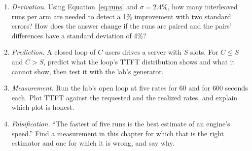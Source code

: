 \begin{enumerate}
\item \emph{Derivation.} Using Equation~\ref{eq:runs} and $\sigma = 2.4\%$, how
  many interleaved runs per arm are needed to detect a 1\% improvement with two
  standard errors? How does the answer change if the runs are paired and the
  pairs' differences have a standard deviation of 4\%?
\item \emph{Prediction.} A closed loop of $C$ users drives a server with $S$
  slots. For $C \le S$ and $C > S$, predict what the loop's TTFT distribution
  shows and what it cannot show, then test it with the lab's generator.
\item \emph{Measurement.} Run the lab's open loop at five rates for 60 and for
  600 seconds each. Plot TTFT against the requested and the realized rates, and
  explain which plot is honest.
\item \emph{Falsification.} ``The fastest of five runs is the best estimate of
  an engine's speed.'' Find a measurement in this chapter for which that is the
  right estimator and one for which it is wrong, and say why.
\end{enumerate}
